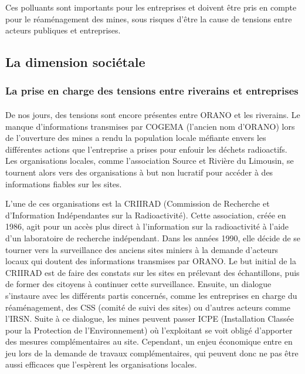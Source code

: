 \documentclass{article}
\begin{document}
Ces polluants sont importants pour les entreprises et doivent être pris en compte pour le réaménagement des mines, sous risques d'être la cause de tensions entre acteurs publiques et entreprises.


\subsection{La dimension sociétale}
\subsubsection{La prise en charge des tensions entre riverains et entreprises}
\paragraph{} De nos jours, des tensions sont encore présentes entre ORANO et les riverains. Le manque d’informations transmises par COGEMA (l’ancien nom d’ORANO) lors de l’ouverture des mines a rendu la population locale méfiante envers les différentes actions que l’entreprise a prises pour enfouir les déchets radioactifs. Les organisations locales, comme l’association Source et Rivière du Limousin, se tournent alors vers des organisations à but non lucratif pour accéder à des informations fiables sur les sites. 

L’une de ces organisations est la CRIIRAD (Commission de Recherche et d'Information Indépendantes sur la Radioactivité). Cette association, créée en 1986, agit pour un accès plus direct à l’information sur la radioactivité à l’aide d’un laboratoire de recherche indépendant. Dans les années 1990, elle décide de se tourner vers la surveillance des anciens sites miniers à la demande d’acteurs locaux qui doutent des informations transmises par ORANO. Le but initial de la CRIIRAD est de faire des constats sur les sites en prélevant des échantillons, puis de former des citoyens à continuer cette surveillance. Ensuite, un dialogue s'instaure avec les différents partis concernés, comme les entreprises en charge du réaménagement, des CSS (comité de suivi des sites) ou d’autres acteurs comme l’IRSN. Suite à ce dialogue, les mines peuvent passer ICPE (Installation Classée pour la Protection de l'Environnement) où l’exploitant se voit obligé d’apporter des mesures complémentaires au site. Cependant, un enjeu économique entre en jeu lors de la demande de travaux complémentaires, qui peuvent donc ne pas être aussi efficaces que l’espèrent les organisations locales. 
\end{document}
